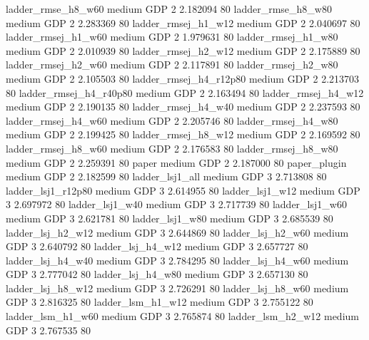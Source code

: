     ladder_rmse_h8_w60     medium      GDP                 2 2.182094 80
    ladder_rmse_h8_w80     medium      GDP                 2 2.283369 80
   ladder_rmsej_h1_w12     medium      GDP                 2 2.040697 80
   ladder_rmsej_h1_w60     medium      GDP                 2 1.979631 80
   ladder_rmsej_h1_w80     medium      GDP                 2 2.010939 80
   ladder_rmsej_h2_w12     medium      GDP                 2 2.175889 80
   ladder_rmsej_h2_w60     medium      GDP                 2 2.117891 80
   ladder_rmsej_h2_w80     medium      GDP                 2 2.105503 80
ladder_rmsej_h4_r12p80     medium      GDP                 2 2.213703 80
ladder_rmsej_h4_r40p80     medium      GDP                 2 2.163494 80
   ladder_rmsej_h4_w12     medium      GDP                 2 2.190135 80
   ladder_rmsej_h4_w40     medium      GDP                 2 2.237593 80
   ladder_rmsej_h4_w60     medium      GDP                 2 2.205746 80
   ladder_rmsej_h4_w80     medium      GDP                 2 2.199425 80
   ladder_rmsej_h8_w12     medium      GDP                 2 2.169592 80
   ladder_rmsej_h8_w60     medium      GDP                 2 2.176583 80
   ladder_rmsej_h8_w80     medium      GDP                 2 2.259391 80
                 paper     medium      GDP                 2 2.187000 80
          paper_plugin     medium      GDP                 2 2.182599 80
       ladder_lsj1_all     medium      GDP                 3 2.713808 80
    ladder_lsj1_r12p80     medium      GDP                 3 2.614955 80
       ladder_lsj1_w12     medium      GDP                 3 2.697972 80
       ladder_lsj1_w40     medium      GDP                 3 2.717739 80
       ladder_lsj1_w60     medium      GDP                 3 2.621781 80
       ladder_lsj1_w80     medium      GDP                 3 2.685539 80
     ladder_lsj_h2_w12     medium      GDP                 3 2.644869 80
     ladder_lsj_h2_w60     medium      GDP                 3 2.640792 80
     ladder_lsj_h4_w12     medium      GDP                 3 2.657727 80
     ladder_lsj_h4_w40     medium      GDP                 3 2.784295 80
     ladder_lsj_h4_w60     medium      GDP                 3 2.777042 80
     ladder_lsj_h4_w80     medium      GDP                 3 2.657130 80
     ladder_lsj_h8_w12     medium      GDP                 3 2.726291 80
     ladder_lsj_h8_w60     medium      GDP                 3 2.816325 80
     ladder_lsm_h1_w12     medium      GDP                 3 2.755122 80
     ladder_lsm_h1_w60     medium      GDP                 3 2.765874 80
     ladder_lsm_h2_w12     medium      GDP                 3 2.767535 80

